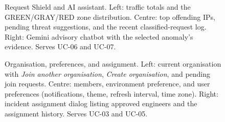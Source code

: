 \begin{figure}[H]
\centering
{}\hfill
{}\hfill
{}
\caption[Request Shield and AI assistant screens]{Request Shield and AI assistant.  Left: traffic totals and the
  GREEN/GRAY/RED zone distribution.  Centre: top offending IPs, pending
  threat suggestions, and the recent classified-request log.  Right: Gemini
  advisory chatbot with the selected anomaly's evidence.  Serves UC-06 and
  UC-07.}\label{fig:app_ai_shield}
\end{figure}

\begin{figure}[H]
\centering
{}\hfill
{}\hfill
{}
\caption[Organisation, preferences, and assignment screens]{Organisation, preferences, and assignment.  Left: current
  organisation with \textit{Join another organisation}, \textit{Create
  organisation}, and pending join requests.  Centre: members, environment
  preference, and user preferences (notifications, theme, refresh interval,
  time zone).  Right: incident assignment dialog listing approved engineers
  and the assignment history.  Serves UC-03 and UC-05.}\label{fig:app_org_assign}
\end{figure}
